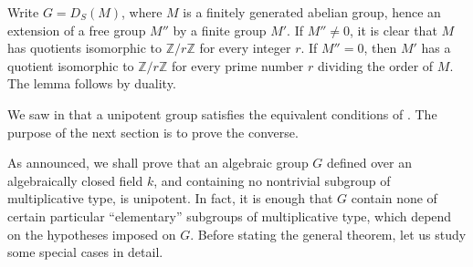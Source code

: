 
Write \(G=D_S(M)\), where \(M\) is a finitely generated abelian
group, hence an extension of a free group \(M''\) by a finite group
\(M'\).  If \(M''\ne0\), it is clear that \(M\) has quotients
isomorphic to \(\mathbb Z/r\mathbb Z\) for every integer \(r\).  If
\(M''=0\), then \(M'\) has a quotient isomorphic to
\(\mathbb Z/r\mathbb Z\) for every prime number \(r\) dividing the
order of \(M\).  The lemma follows by duality.

We saw in  that a unipotent group satisfies the
equivalent conditions of .  The purpose of the next section is
to prove the converse.


As announced, we shall prove that an algebraic group \(G\) defined
over an algebraically closed field \(k\), and containing no
nontrivial subgroup of multiplicative type, is unipotent.  In fact,
it is enough that \(G\) contain none of certain particular
``elementary'' subgroups of multiplicative type, which depend on the
hypotheses imposed on \(G\).  Before stating the general theorem,
let us study some special cases in detail.
